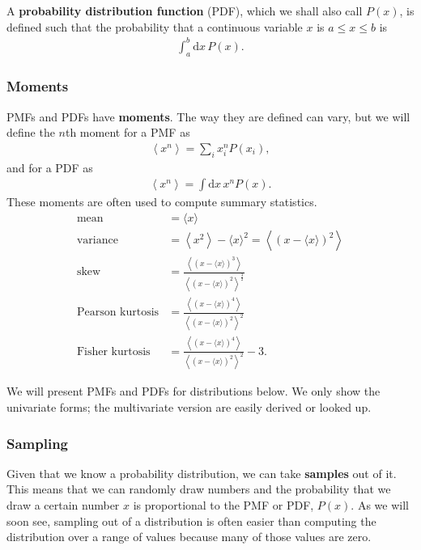 A \textbf{probability distribution function} (PDF), which we shall
also call $P(x)$, is defined such that the probability that a
continuous variable $x$ is $a \le x \le b$ is
\begin{align}
\int_a^b \mathrm{d}x\,P(x).
\end{align}

\subsubsection{Moments}
PMFs and PDFs have \textbf{moments}.  The way they are defined can
vary, but we will define the $n$th moment for a PMF as
\begin{align}
\left\langle x^n \right\rangle = \sum_i x_i^n P(x_i),
\end{align}
and for a PDF as
\begin{align}
\left\langle x^n \right\rangle = \int \mathrm{d}x\, x^n P(x).
\end{align}
These moments are often used to compute summary statistics.
\begin{align}
\text{mean} &= \langle x \rangle \\
\text{variance} &= \left\langle x^2 \right\rangle - \langle x \rangle^2
= \left\langle(x - \langle x \rangle)^2 \right\rangle \\
\text{skew} &= \frac{\left\langle(x - \langle x \rangle)^3 \right\rangle}
{\left\langle(x - \langle x \rangle)^2 \right\rangle^{\frac{3}{2}}} \\
\text{Pearson kurtosis} &= \frac{\left\langle(x - \langle x \rangle)^4 \right\rangle}
{\left\langle(x - \langle x \rangle)^2 \right\rangle^2} \\
\text{Fisher kurtosis} &= \frac{\left\langle(x - \langle x \rangle)^4 \right\rangle}
{\left\langle(x - \langle x \rangle)^2 \right\rangle^2} - 3.
\end{align}

We will present PMFs and PDFs for distributions below.  We only show
the univariate forms; the multivariate version are easily derived or
looked up.


\subsubsection{Sampling}
Given that we know a probability distribution, we can take
\textbf{samples} out of it.  This means that we can randomly draw
numbers and the probability that we draw a certain number $x$ is
proportional to the PMF or PDF, $P(x)$.  As we will soon see, sampling
out of a distribution is often easier than computing the distribution
over a range of values because many of those values are zero. 

